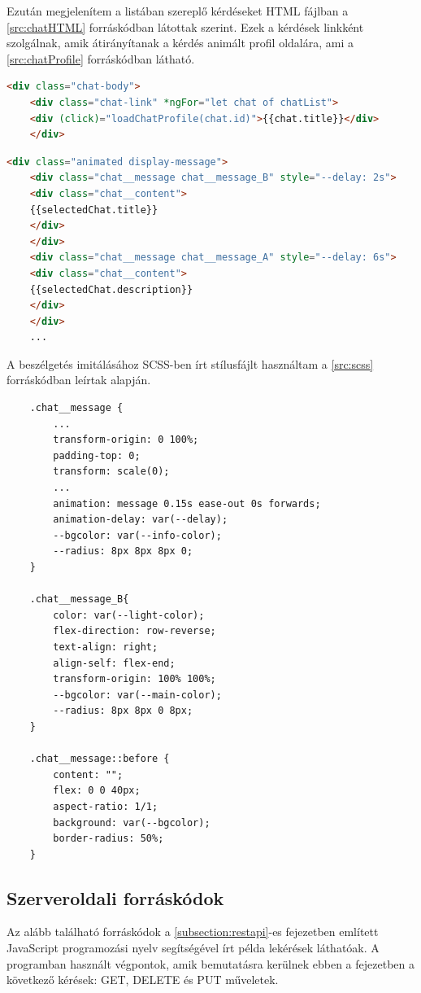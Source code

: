 Ezután megjelenítem a listában szereplő kérdéseket HTML fájlban a \ref{src:chatHTML} forráskódban látottak szerint. Ezek a kérdések linkként szolgálnak, amik átirányítanak a kérdés animált profil oldalára, ami a \ref{src:chatProfile} forráskódban látható.
\begin{lstlisting}[language=html]
	<div class="chat-body">
	<div class="chat-link" *ngFor="let chat of chatList">
	<div (click)="loadChatProfile(chat.id)">{{chat.title}}</div>
	</div>
\end{lstlisting}

\begin{lstlisting}[language=html]
	<div class="animated display-message">
	<div class="chat__message chat__message_B" style="--delay: 2s">
	<div class="chat__content">
	{{selectedChat.title}}
	</div>
	</div>
	<div class="chat__message chat__message_A" style="--delay: 6s">
	<div class="chat__content">
	{{selectedChat.description}}
	</div>
	</div>
	...
\end{lstlisting}

A beszélgetés imitálásához SCSS-ben írt stílusfájlt használtam a \ref{src:scss} forráskódban leírtak alapján.

\begin{lstlisting}
	.chat__message {
		...
		transform-origin: 0 100%;
		padding-top: 0;
		transform: scale(0);
		...
		animation: message 0.15s ease-out 0s forwards;
		animation-delay: var(--delay);
		--bgcolor: var(--info-color);
		--radius: 8px 8px 8px 0;
	}
	
	.chat__message_B{
		color: var(--light-color);
		flex-direction: row-reverse;
		text-align: right;
		align-self: flex-end;
		transform-origin: 100% 100%;
		--bgcolor: var(--main-color);
		--radius: 8px 8px 0 8px;
	}
	
	.chat__message::before {
		content: "";
		flex: 0 0 40px;
		aspect-ratio: 1/1;
		background: var(--bgcolor);
		border-radius: 50%;
	}
\end{lstlisting}

\subsection{Szerveroldali forráskódok}
\label{subsection:serversource}
Az alább található forráskódok a \ref{subsection:restapi}-es fejezetben említett JavaScript programozási nyelv segítségével írt példa lekérések láthatóak. A programban használt végpontok, amik bemutatásra kerülnek ebben a fejezetben a következő kérések: GET, DELETE és PUT műveletek.

